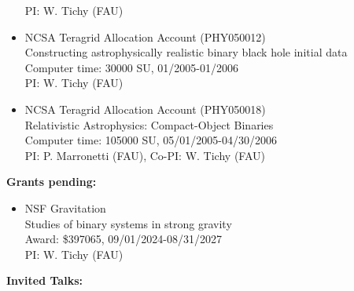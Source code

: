 \documentclass[11pt]{article}
\begin{document}
\begin{itemize}
	PI: W. Tichy (FAU)
\item	NCSA Teragrid Allocation Account (PHY050012)\\
	Constructing astrophysically realistic binary black hole initial data\\
	Computer time: 30000 SU, 01/2005-01/2006\\
	PI: W. Tichy (FAU)
\item	NCSA Teragrid Allocation Account (PHY050018)\\
	Relativistic Astrophysics: Compact-Object Binaries\\
	Computer time: 105000 SU, 05/01/2005-04/30/2006\\
	PI: P. Marronetti (FAU), Co-PI: W. Tichy (FAU)
\end{itemize}


\bigskip

{\bf Grants pending:}

\begin{itemize}
\item	NSF Gravitation\\
	Studies of binary systems in strong gravity\\
	Award: \$397065, 09/01/2024-08/31/2027\\
	PI: W. Tichy (FAU)
\end{itemize}


\bigskip

{\bf Invited Talks:}
\end{document}
